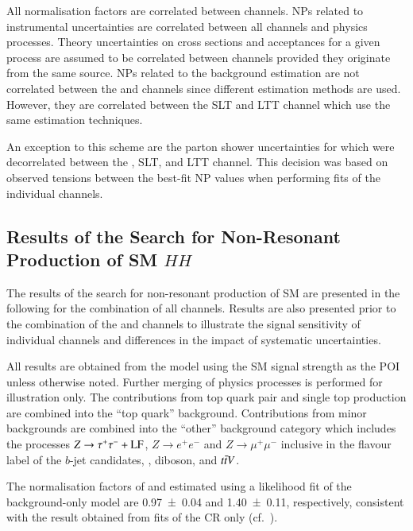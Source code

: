 All normalisation factors are correlated between channels. NPs related to
instrumental uncertainties are correlated between all channels and physics
processes. Theory uncertainties on cross sections and acceptances for a given
process are assumed to be correlated between channels provided they originate
from the same source. NPs related to the \faketauhadvis background estimation
are not correlated between the \hadhad and \lephad channels since different
estimation methods are used. However, they are correlated between the \lephad
SLT and LTT channel which use the same estimation techniques.

An exception to this scheme are the parton shower uncertainties for \ttbar which
were decorrelated between the \hadhad, \lephad SLT, and \lephad LTT
channel. This decision was based on observed tensions between the best-fit NP
values when performing fits of the individual channels.



\subsection{Results of the Search for Non-Resonant Production of SM $HH$}
\label{sec:results_nonres}

The results of the search for non-resonant production of SM \HH are presented in
the following for the combination of all channels. Results are also presented
prior to the combination of the \hadhad and \lephad channels to illustrate the
signal sensitivity of individual channels and differences in the impact of
systematic uncertainties.

All results are obtained from the model using the SM \HH signal strength as the
POI unless otherwise noted. Further merging of physics processes is performed
for illustration only. The contributions from top quark pair and single top
production are combined into the ``top quark'' background. Contributions from
minor backgrounds are combined into the ``other'' background category which
includes the processes $Z \to \tau^{+} \tau^{-} + \text{LF}$, $Z \to e^{+}e^{-}$ and
$Z \to \mu^{+}\mu^{-}$ inclusive in the flavour label of the $b$-jet candidates,
\Wjets, diboson, and $t\bar{t} V$.

The normalisation factors of \ttbar and \ZHF estimated using a likelihood fit of
the background-only model are \num{0.97 +- 0.04} and \num{1.40 +- 0.11},
respectively, consistent with the result obtained from fits of the CR only (cf.\
).

